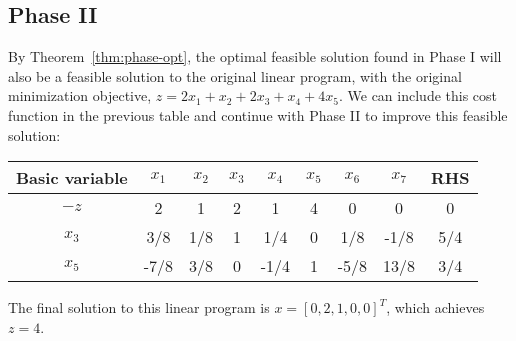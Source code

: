 \subsection{Phase II}
By Theorem~\ref{thm:phase-opt}, the optimal feasible solution found in Phase I will also be a feasible solution to the original linear program, with the original minimization objective, $z = 2x_1 + x_2 + 2x_3 + x_4 + 4x_5$. We can include this cost function in the previous table and continue with Phase II to improve this feasible solution:
\begin{center}
\begin{tabular}{|c|c|c|c|c|c|c|c|c|}
\hline
Basic variable &$x_1$ &$x_2$ &$x_3$ &$x_4$ &$x_5$ &$x_6$ &$x_7$ &RHS \\
\hline
$-z$	&2 &1 &2 &1 &4 &0 &0 &0 \\
$x_3$	&3/8 &1/8 &1 &1/4 &0 &1/8 &-1/8 &5/4 \\
$x_5$ &-7/8 &3/8 &0 &-1/4 &1 &-5/8 &13/8 &3/4 \\
\hline
\end{tabular}
\end{center}

The final solution to this linear program is $x = \left[0, 2, 1, 0, 0\right]^T$, which achieves $z = 4$.
